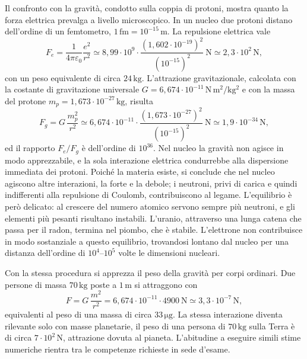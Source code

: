 \documentclass[11pt,a4paper]{article}
\newcommand{\epz}{\varepsilon_0}
\begin{document}
Il confronto con la gravità, condotto sulla coppia di protoni, mostra quanto la forza elettrica prevalga a livello microscopico. In un nucleo due protoni distano dell'ordine di un femtometro, $1\,\mathrm{fm}=10^{-15}\,\mathrm{m}$. La repulsione elettrica vale
\[
F_e=\frac{1}{4\pi\epz}\frac{e^2}{r^2}\simeq 8,99\cdot 10^{9}\cdot\frac{(1,602\cdot 10^{-19})^2}{(10^{-15})^2}\ \mathrm{N}\simeq 2,3\cdot 10^{2}\,\mathrm{N},
\]
con un peso equivalente di circa $24\,\mathrm{kg}$. L'attrazione gravitazionale, calcolata con la costante di gravitazione universale $G=6,674\cdot 10^{-11}\,\mathrm{N\,m^2/kg^2}$ e con la massa del protone $m_p=1,673\cdot 10^{-27}\,\mathrm{kg}$, risulta
\[
F_g=G\,\frac{m_p^2}{r^2}\simeq 6,674\cdot 10^{-11}\cdot\frac{(1,673\cdot 10^{-27})^2}{(10^{-15})^2}\ \mathrm{N}\simeq 1,9\cdot 10^{-34}\,\mathrm{N},
\]
ed il rapporto $F_e/F_g$ è dell'ordine di $10^{36}$. Nel nucleo la gravità non agisce in modo apprezzabile, e la sola interazione elettrica condurrebbe alla dispersione immediata dei protoni. Poiché la materia esiste, si conclude che nel nucleo agiscono altre interazioni, la forte e la debole; i neutroni, privi di carica e quindi indifferenti alla repulsione di Coulomb, contribuiscono al legame. L'equilibrio è però delicato: al crescere del numero atomico servono sempre più neutroni, e gli elementi più pesanti risultano instabili. L'uranio, attraverso una lunga catena che passa per il radon, termina nel piombo, che è stabile. L'elettrone non contribuisce in modo sostanziale a questo equilibrio, trovandosi lontano dal nucleo per una distanza dell'ordine di $10^4$--$10^5$ volte le dimensioni nucleari.

Con la stessa procedura si apprezza il peso della gravità per corpi ordinari. Due persone di massa $70\,\mathrm{kg}$ poste a $1\,\mathrm{m}$ si attraggono con
\[
F=G\,\frac{m^2}{r^2}=6,674\cdot 10^{-11}\cdot 4900\ \mathrm{N}\simeq 3,3\cdot 10^{-7}\,\mathrm{N},
\]
equivalenti al peso di una massa di circa $33\,\mathrm{\mu g}$. La stessa interazione diventa rilevante solo con masse planetarie, il peso di una persona di $70\,\mathrm{kg}$ sulla Terra è di circa $7\cdot 10^{2}\,\mathrm{N}$, attrazione dovuta al pianeta. L'abitudine a eseguire simili stime numeriche rientra tra le competenze richieste in sede d'esame.
\end{document}
